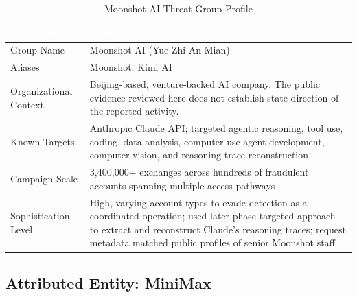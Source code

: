 \documentclass[11pt,a4paper]{article}
\begin{document}
\begin{table}[H]
\centering
\renewcommand{\arraystretch}{1.3}
\begin{tabularx}{\textwidth}{|L{4.5cm}|X|}
\hline
{}
\textcolor{white}{\textbf{Attribute}} & \textcolor{white}{\textbf{Detail}} \\
\hline
Group Name & Moonshot AI (Yue Zhi An Mian) \\
\hline
Aliases & Moonshot, Kimi AI \\
\hline
Organizational Context & Beijing-based, venture-backed AI company. The public evidence reviewed here does not establish state direction of the reported activity. \\
\hline
Known Targets & Anthropic Claude API; targeted agentic reasoning, tool use, coding, data analysis, computer-use agent development, computer vision, and reasoning trace reconstruction \\
\hline
Campaign Scale & 3,400,000+ exchanges across hundreds of fraudulent accounts spanning multiple access pathways \cite{anthropic_blog}\cite{techcrunch} \\
\hline
Sophistication Level & High, varying account types to evade detection as a coordinated operation; used later-phase targeted approach to extract and reconstruct Claude's reasoning traces; request metadata matched public profiles of senior Moonshot staff \cite{anthropic_blog} \\
\hline
\end{tabularx}
\caption{Moonshot AI Threat Group Profile}
\label{tab:moonshot}
\end{table}

\subsection{Attributed Entity: MiniMax}
\end{document}
